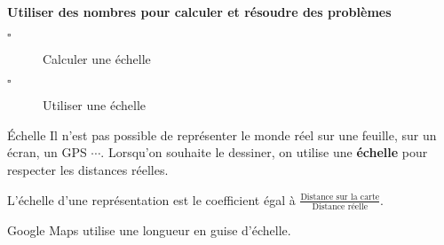 \begin{titre}[La proportionnalité]

\end{titre}


\begin{CpsCol}
\textbf{Utiliser des nombres pour calculer et résoudre des problèmes}
\begin{description}
\item[$\square$] Calculer une échelle
\item[$\square$] Utiliser une échelle
\end{description}
\end{CpsCol}


\begin{DefT}{Échelle}
Il n'est pas possible de représenter le monde réel sur une feuille, sur un écran, un GPS $\cdots$. Lorsqu'on souhaite le dessiner, on utilise une \textbf{échelle} pour respecter les distances réelles.
\end{DefT}

\begin{Rqs}
\begin{description}
\item L'échelle d'une représentation est le coefficient égal à $\frac{\text{Distance sur la carte}}{\text{Distance réelle}}$. 
\item Google Maps utilise une longueur en guise d'échelle.
\end{description}
\end{Rqs}

